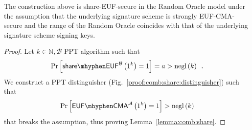     \begin{lemma}
      \label{lemma:comb:share}
      The construction above is \textsf{share-EUF}-secure in the Random Oracle
      model under the assumption that the underlying signature scheme is
      strongly \textsf{EUF-CMA}-secure and the range of the Random Oracle
      coincides with that of the underlying signature scheme signing keys.
    \end{lemma}

    \begin{proof}
      Let $k \in \mathbb{N}, \mathcal{B}$ PPT algorithm such that
      \begin{equation*}
        \Pr\left[\mathsf{share \mhyphen EUF}^{\mathcal{B}}\left(1^k\right) =
        1\right] = a > \mathrm{negl}\left(k\right) \enspace.
      \end{equation*}
      We construct a PPT distinguisher \adversary{}
      (Fig.~\ref{proof:comb:share:distinguisher}) such that
      \begin{equation*}
        \Pr\left[\mathsf{EUF \mhyphen CMA}^{\adversary}\left(1^k\right) =
        1\right] > \mathrm{negl}\left(k\right)
      \end{equation*}
      that breaks the assumption, thus proving Lemma~\ref{lemma:comb:share}.


\end{proof}
